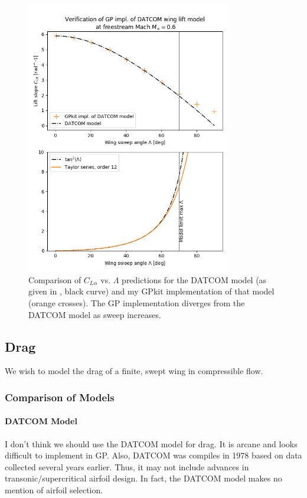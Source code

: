 \documentclass[12pt]{article}
\begin{document}
\begin{figure}[hbt!]
    \centering
    \includegraphics[width=0.8\textwidth]{figures/wing_lift_model_compare/GP_sweep}
    \caption{\label{fig:wing_model_GP_sweep} Comparison of $C_{L\alpha}$ vs. $\Lambda$ predictions for the DATCOM model (as given in \cite{Raymer2012}, black curve) and my GPkit implementation of that model (orange crosses). The GP implementation diverges from the DATCOM model as sweep increases.}
\end{figure}


\subsection{Drag}
We wish to model the drag of a finite, swept wing in compressible flow. 

\subsubsection{Comparison of Models}
\paragraph{DATCOM Model}
I don't think we should use the DATCOM model for drag. It is arcane and looks difficult to implement in GP. Also, DATCOM was compiles in 1978 based on data collected several years earlier. Thus, it may not include advances in transonic/supercritical airfoil design. In fact, the DATCOM model makes no mention of airfoil selection.
\end{document}
